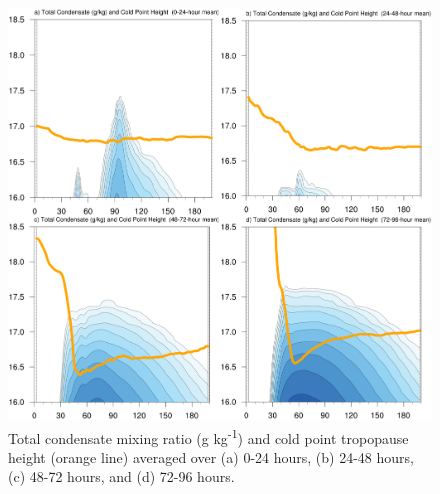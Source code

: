 \documentclass{ametsoc}
\begin{document}
\begin{figure}[ht]
\centerline{\includegraphics[width=39pc]{figures/fig11_qtot.png}}
\caption{Total condensate mixing ratio (g kg\textsuperscript{-1}) and cold point tropopause height (orange line) averaged over (a) 0-24 hours, (b) 24-48 hours, (c) 48-72 hours, and (d) 72-96 hours.}
\label{fig:qtot}
\end{figure}

\end{document}
